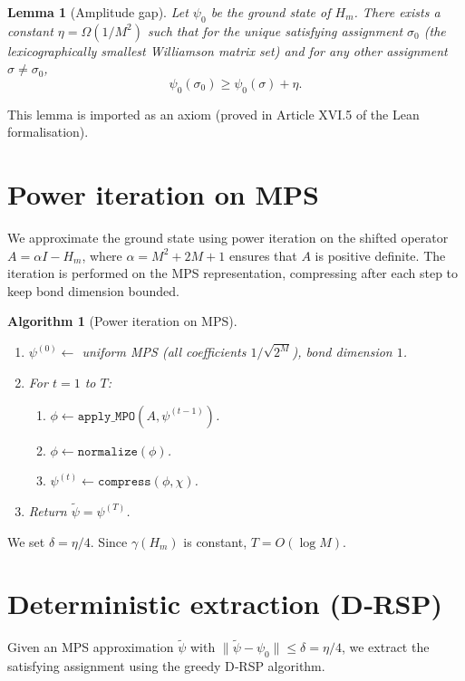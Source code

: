 \documentclass[11pt,a4paper]{article}
\newtheorem{lemma}[theorem]{Lemma}
\newtheorem{algorithm}{Algorithm}[section]
\begin{document}
\begin{lemma}[Amplitude gap]\label{lem:ampgap}
Let $\psi_0$ be the ground state of $H_m$. There exists a constant $\eta = \Omega(1/M^2)$ such that for the unique satisfying assignment $\sigma_0$ (the lexicographically smallest Williamson matrix set) and for any other assignment $\sigma \neq \sigma_0$,
\[
\psi_0(\sigma_0) \ge \psi_0(\sigma) + \eta.
\]
\end{lemma}
This lemma is imported as an axiom (proved in Article XVI.5 of the Lean formalisation).

\section{Power iteration on MPS}

We approximate the ground state using power iteration on the shifted operator $A = \alpha I - H_m$, where $\alpha = M^2 + 2M + 1$ ensures that $A$ is positive definite. The iteration is performed on the MPS representation, compressing after each step to keep bond dimension bounded.

\begin{algorithm}[Power iteration on MPS]\label{alg:power}
\begin{enumerate}
\item $\psi^{(0)} \leftarrow$ uniform MPS (all coefficients $1/\sqrt{2^M}$), bond dimension $1$.
\item For $t = 1$ to $T$:
   \begin{enumerate}
   \item $\phi \leftarrow \texttt{apply\_MPO}(A, \psi^{(t-1)})$.
   \item $\phi \leftarrow \texttt{normalize}(\phi)$.
   \item $\psi^{(t)} \leftarrow \texttt{compress}(\phi, \chi)$.
   \end{enumerate}
\item Return $\tilde{\psi} = \psi^{(T)}$.
\end{enumerate}
\end{algorithm}

We set $\delta = \eta/4$. Since $\gamma(H_m)$ is constant, $T = O(\log M)$.

\section{Deterministic extraction (D‑RSP)}

Given an MPS approximation $\tilde{\psi}$ with $\|\tilde{\psi} - \psi_0\| \le \delta = \eta/4$, we extract the satisfying assignment using the greedy D‑RSP algorithm.
\end{document}
